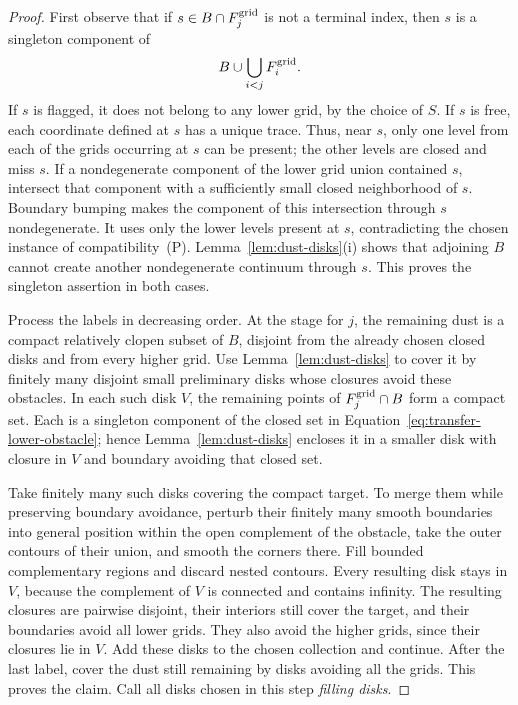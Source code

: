 \begin{proof}
First observe that if $s\in B\cap F_j^{\rm grid}$ is not a terminal
index, then $s$ is a singleton component of
\begin{equation}\label{eq:transfer-lower-obstacle}
 B\cup\bigcup_{i<j}F_i^{\rm grid}.
\end{equation}
If $s$ is flagged, it does not belong to any lower grid, by the choice
of $S$.  If $s$ is free, each coordinate defined at $s$ has a unique
trace.  Thus, near $s$, only one level from each of the grids occurring
at $s$ can be present; the other levels are closed and miss $s$.
If a nondegenerate component of the lower grid union contained $s$,
intersect that component with a sufficiently small closed neighborhood
of $s$.  Boundary bumping makes the component of this intersection
through $s$ nondegenerate.  It uses only the lower levels present at
$s$, contradicting the chosen instance of compatibility~(P).
Lemma~\ref{lem:dust-disks}\textup{(i)} shows that adjoining $B$ cannot
create another nondegenerate continuum through $s$.  This proves the
singleton assertion in both cases.

Process the labels in decreasing order.  At the stage for $j$, the
remaining dust is a compact relatively clopen subset of $B$, disjoint
from the already chosen closed disks and from every higher grid.  Use
Lemma~\ref{lem:dust-disks} to cover it by finitely many disjoint small
preliminary disks whose closures avoid these obstacles.  In each such
disk $V$, the remaining points of $F_j^{\rm grid}\cap B$ form a
compact set.  Each is a singleton component of the closed set in
Equation~\eqref{eq:transfer-lower-obstacle}; hence
Lemma~\ref{lem:dust-disks} encloses it in a smaller disk with closure
in $V$ and boundary avoiding that closed set.

Take finitely many such disks covering the compact target.  To merge
them while preserving boundary avoidance, perturb their
finitely many smooth boundaries into general position within the open
complement of the obstacle, take the outer contours of their union,
and smooth the corners there.  Fill bounded complementary regions and
discard nested contours.  Every resulting disk stays in $V$, because
the complement of $V$ is connected and contains infinity.  The
resulting closures are pairwise disjoint, their interiors still cover
the target, and their boundaries avoid all lower grids.  They also
avoid the higher grids, since their closures lie in $V$.  Add these
disks to the chosen collection and continue.  After the last label,
cover the dust still remaining by disks avoiding all the grids.  This
proves the claim.  Call all disks chosen in this step
\emph{filling disks}.


\end{proof}
